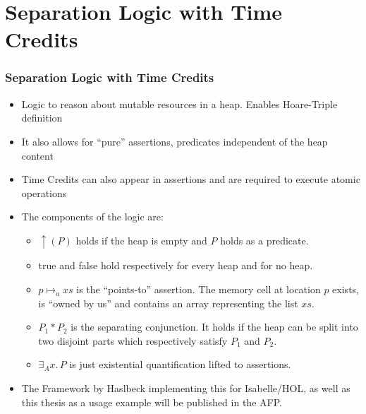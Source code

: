 \section{Separation Logic with Time Credits}
\begin{frame}
	\frametitle{Separation Logic with Time Credits}
	\begin{itemize}
		\item Logic to reason about mutable resources in a heap. Enables Hoare-Triple definition
		\item It also allows for ``pure'' assertions, predicates independent of the heap content
		\item Time Credits can also appear in assertions and are required to execute atomic operations
		\item The components of the logic are: \begin{itemize}
			\item $\uparrow(P)$ holds if the heap is empty and $P$ holds as a predicate.
			\item true and false hold respectively for every heap and for no heap.
			\item $p \mapsto_a xs$ is the ``points-to'' assertion. The memory cell at location $p$ exists, is ``owned by us'' and contains an array representing the list $xs$.
			\item $P_1 * P_2$ is the separating conjunction. It holds if the heap can be split into two disjoint parts which respectively satisfy $P_1$ and $P_2$.
			\item $\exists_A x.\, P$ is just existential quantification lifted to assertions.
		\end{itemize}
	\item The Framework by Haslbeck implementing this for Isabelle/HOL, as well as this thesis as a usage example will be published in the AFP.
	\end{itemize}
\end{frame}

